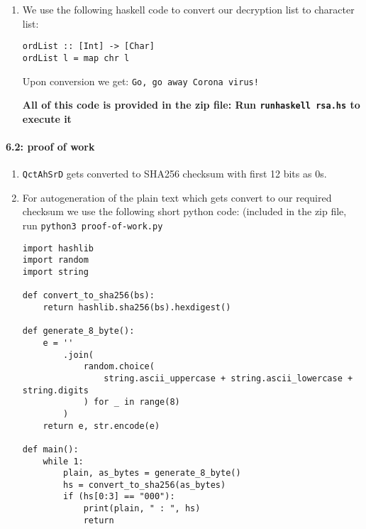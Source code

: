 \documentclass[a4paper]{article}
\begin{document}
\begin{enumerate}[label=(\alph*)]
\begin{verbatim}
dec :: Integer -> Key -> Integer
dec c (Key n d) = c^d `mod` n

decList :: [Integer] -> Key -> [Integer]
decList ml k = map (\x -> dec x k) ml
    \end{verbatim}

    Decryption result in following list:
    \begin{verbatim}
    71,111,44,32,103,111,32,
    97,119,97,121,32,67,111,
    114,111,110,97,32,118,105,
    114,117,115,33
    \end{verbatim}

\item We use the following haskell code to convert our decryption list to character list:
    \begin{verbatim}
ordList :: [Int] -> [Char]
ordList l = map chr l
    \end{verbatim}
    Upon conversion we get: \texttt{Go, go away Corona virus!}

    \textbf{All of this code is provided in the zip file: Run \texttt{runhaskell rsa.hs} to execute it}
\end{enumerate}

\paragraph*{6.2: proof of work}
\begin{enumerate}[label=(\alph*)]
    \item \texttt{QctAhSrD} gets converted to SHA256 checksum with first 12 bits as 0s.
    \item For autogeneration of the plain text which gets convert to our required checksum we use the following short python code: (included in the zip file, run \texttt{python3 proof-of-work.py}
    \begin{verbatim}
import hashlib
import random
import string

def convert_to_sha256(bs):
    return hashlib.sha256(bs).hexdigest()

def generate_8_byte():
    e = ''
        .join(
            random.choice(
                string.ascii_uppercase + string.ascii_lowercase + string.digits
            ) for _ in range(8)
        )
    return e, str.encode(e)

def main():
    while 1:
        plain, as_bytes = generate_8_byte()
        hs = convert_to_sha256(as_bytes)
        if (hs[0:3] == "000"):
            print(plain, " : ", hs)
            return

    \end{verbatim}
\end{enumerate}
\end{document}
